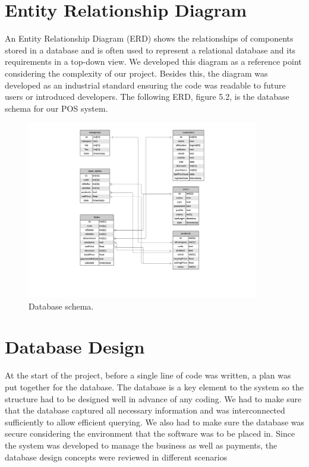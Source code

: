 \section{Entity Relationship Diagram} 

An Entity Relationship Diagram (ERD) shows the relationships of components stored in a database and is often used to represent a relational database and its requirements in a top-down view. We developed this diagram as a reference point considering the complexity of our project. Besides this, the diagram was developed as an industrial standard ensuring the code was readable to future users or introduced developers. The following ERD, figure 5.2, is the database schema for our POS system.

\begin{figure}[h!]
	\caption{Database schema.}
	\label{image:myImageName}
	\centering
	\includegraphics[width=0.9\textwidth]{Fig images/database schema.png}
\end{figure}

\section{Database Design}

At the start of the project, before a single line of code was written, a plan was put together for the database. The database is a key element to the system so the structure had to be designed well in advance of any coding. We had to make sure that the database captured all necessary information and was interconnected sufficiently to allow efficient querying. We also had to make sure the database was secure considering the environment that the software was to be placed in. Since the system was developed to manage the business as well as payments, the database design concepts were reviewed in different scenarios 

